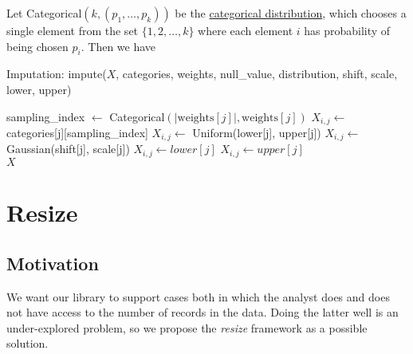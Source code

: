 \documentclass[11pt]{scrartcl} %
\begin{document}
Let Categorical$(k, (p_1, \hdots, p_k))$ be the \href{https://en.wikipedia.org/wiki/Categorical_distribution}{categorical distribution}, which chooses 
a single element from the set $\{1, 2, \hdots, k\}$ where each element $i$ has probability of being chosen $p_i$.
Then we have
\begin{algorithm}[H]
    \label{alg:imputation}
    \caption{Imputation: \newline impute($X$, categories, weights, null\_value, distribution, shift, scale, lower, upper)}
    \begin{algorithmic}[1]
         
             
                 
                        \State sampling\_index $\gets$ Categorical$(\big\vert \text{weights}[j] \big\vert, \text{weights}[j])$ 
                        \State $X_{i,j} \gets$ categories[j][sampling\_index] 
                    \EndIf
                \Else {}
                            \State $X_{i,j} \gets$ Uniform(lower[j], upper[j])
                            \State $X_{i,j} \gets$ Gaussian(shift[j], scale[j])
                                \State $X_{i,j} \gets lower[j]$
                                \State $X_{i,j} \gets upper[j]$
                            \EndIf
                        \EndIf
                    \EndIf
                \EndIf
            \EndFor
        \EndFor
        \\ \Return $X$
    \end{algorithmic}
\end{algorithm}

\section{Resize}
\label{sec:resize}

\subsection{Motivation}
We want our library to support cases both in which the analyst does and does not have access to
the number of records in the data. Doing the latter well is an under-explored problem, so we 
propose the \emph{resize} framework as a possible solution.
\end{document}
